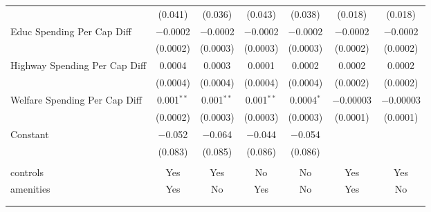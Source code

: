 \begin{table}[!htbp]
\begin{tabular}{@{\extracolsep{5pt}}lcccccc}
  & (0.041) & (0.036) & (0.043) & (0.038) & (0.018) & (0.018) \\ 
  Educ Spending Per Cap Diff & $-$0.0002 & $-$0.0002 & $-$0.0002 & $-$0.0002 & $-$0.0002 & $-$0.0002 \\ 
  & (0.0002) & (0.0003) & (0.0003) & (0.0003) & (0.0002) & (0.0002) \\ 
  Highway Spending Per Cap Diff & 0.0004 & 0.0003 & 0.0001 & 0.0002 & 0.0002 & 0.0002 \\ 
  & (0.0004) & (0.0004) & (0.0004) & (0.0004) & (0.0002) & (0.0002) \\ 
  Welfare Spending Per Cap Diff & 0.001$^{**}$ & 0.001$^{**}$ & 0.001$^{**}$ & 0.0004$^{*}$ & $-$0.00003 & $-$0.00003 \\ 
  & (0.0002) & (0.0003) & (0.0003) & (0.0003) & (0.0001) & (0.0001) \\ 
  Constant & $-$0.052 & $-$0.064 & $-$0.044 & $-$0.054 &  &  \\ 
  & (0.083) & (0.085) & (0.086) & (0.086) &  &  \\ 
 \hline \\[-1.8ex] 
controls & Yes & Yes & No & No & Yes & Yes \\ 
amenities & Yes & No & Yes & No & Yes & No \\ 
\hline \\[-1.8ex] 
\hline 
\hline \\[-1.8ex] 
\end{tabular} 
\end{table} 
